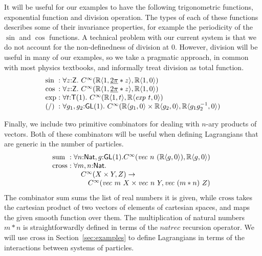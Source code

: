 \documentclass[preprint]{sigplanconf}
\theoremstyle{examplestyle}
\begin{document}
It will be useful for our examples to have the following trigonometric
functions, exponential function and division operation. The types of
each of these functions describes some of their invariance properties,
for example the periodicity of the $\sin$ and $\cos$ functions. A
technical problem with our current system is that we do not account
for the non-definedness of division at $0$. However, division will be
useful in many of our examples, so we take a pragmatic approach, in
common with most physics textbooks, and informally treat division as
total function.
\begin{displaymath}
  \begin{array}{l@{\hspace{0.3em}}c@{\hspace{0.3em}}l}
    \sin &:& \forall z \mathord: \mathsf{Z}.~C^\infty(\mathbb{R}\langle 1, \underline{2\pi} * z \rangle, \mathbb{R} \langle 1, 0 \rangle) \\
    \cos &:& \forall z \mathord: \mathsf{Z}.~C^\infty(\mathbb{R}\langle 1, \underline{2\pi} * z \rangle, \mathbb{R} \langle 1, 0 \rangle) \\
    \mathrm{exp} &:& \forall t \mathord: \mathsf{T}(1).~C^\infty(\mathbb{R}\langle 1, t \rangle, \mathbb{R}\langle \mathit{exp}~t, 0 \rangle) \\
    (/) &:& \forall g_1, g_2 \mathord: \mathsf{GL}(1).~C^\infty(\mathbb{R}\langle g_1, 0 \rangle \times \mathbb{R}\langle g_2, 0\rangle, \mathbb{R}\langle g_1g_2^{-1}, 0 \rangle)
  \end{array}
\end{displaymath}

Finally, we include two primitive combinators for dealing with $n$-ary
products of vectors. Both of these combinators will be useful when
defining Lagrangians that are generic in the number of particles.
\begin{displaymath}
  \begin{array}{l@{\hspace{0.3em}}c@{\hspace{0.3em}}l}
    \mathrm{sum} &:& \forall n \mathord: \mathsf{Nat}, g \mathord: \mathsf{GL}(1). C^\infty(\mathit{vec}~n~(\mathbb{R}\langle g, 0 \rangle), \mathbb{R}\langle g, 0\rangle) \\
    \mathrm{cross} &:& 
    \begin{array}[t]{@{}l}
      \forall m,n \mathord: \mathsf{Nat}.\\
      \quad C^\infty(X \times Y, Z) \to \\
      \quad\quad C^\infty(\mathit{vec}~m~X \times \mathit{vec}~n~Y, \mathit{vec}~(m*n)~Z)
    \end{array}
  \end{array}
\end{displaymath}
The combinator $\mathrm{sum}$ sums the list of real numbers it is
given, while $\mathrm{cross}$ takes the cartesian product of two
vectors of elements of cartesian spaces, and maps the given smooth
function over them. The multiplication of natural numbers $m*n$ is
straightforwardly defined in terms of the $\mathit{natrec}$ recursion
operator. We will use $\mathrm{cross}$ in Section~\ref{sec:examples}
to define Lagrangians in terms of the interactions between systems of
particles.
\end{document}
